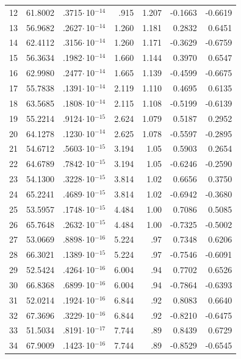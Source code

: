 \begin{longtable}{lrrrrrr}
12 & 61.8002 & .3715$\cdot$\,10$^{-14}$ & .915 & 1.207 & -0.1663 & -0.6619 \\
13 & 56.9682 & .2627$\cdot$\,10$^{-14}$ & 1.260 & 1.181 & 0.2832 & 0.6451 \\
14 & 62.4112 & .3156$\cdot$\,10$^{-14}$ & 1.260 & 1.171 & -0.3629 & -0.6759 \\
15 & 56.3634 & .1982$\cdot$\,10$^{-14}$ & 1.660 & 1.144 & 0.3970 &  0.6547 \\
16 & 62.9980 & .2477$\cdot$\,10$^{-14}$ & 1.665 & 1.139 & -0.4599 & -0.6675 \\
17 & 55.7838 & .1391$\cdot$\,10$^{-14}$ & 2.119 & 1.110 & 0.4695 & 0.6135 \\
18 & 63.5685 & .1808$\cdot$\,10$^{-14}$ & 2.115 & 1.108 & -0.5199 & -0.6139 \\
19 & 55.2214 & .9124$\cdot$\,10$^{-15}$ & 2.624 & 1.079 & 0.5187 & 0.2952 \\
20 & 64.1278 & .1230$\cdot$\,10$^{-14}$ & 2.625 & 1.078 & -0.5597 & -0.2895 \\
21 & 54.6712 & .5603$\cdot$\,10$^{-15}$ & 3.194 & 1.05 & 0.5903 & 0.2654 \\
22 & 64.6789 & .7842$\cdot$\,10$^{-15}$ & 3.194 & 1.05 & -0.6246 & -0.2590 \\
23 & 54.1300 & .3228$\cdot$\,10$^{-15}$ & 3.814 & 1.02 & 0.6656 & 0.3750 \\
24 & 65.2241 & .4689$\cdot$\,10$^{-15}$ & 3.814 & 1.02 & -0.6942 & -0.3680 \\
25 & 53.5957 & .1748$\cdot$\,10$^{-15}$ & 4.484 & 1.00 & 0.7086 & 0.5085 \\
26 & 65.7648 & .2632$\cdot$\,10$^{-15}$ & 4.484 & 1.00 & -0.7325 & -0.5002 \\
27 & 53.0669 & .8898$\cdot$\,10$^{-16}$ & 5.224 & .97 & 0.7348 & 0.6206 \\
28 & 66.3021 & .1389$\cdot$\,10$^{-15}$ & 5.224 & .97 & -0.7546 & -0.6091 \\
29 & 52.5424 & .4264$\cdot$\,10$^{-16}$ & 6.004 & .94 & 0.7702 & 0.6526 \\
30 & 66.8368 & .6899$\cdot$\,10$^{-16}$ & 6.004 & .94 & -0.7864 & -0.6393 \\
31 & 52.0214 & .1924$\cdot$\,10$^{-16}$ & 6.844 & .92 & 0.8083 & 0.6640 \\
32 & 67.3696 & .3229$\cdot$\,10$^{-16}$ & 6.844 & .92 & -0.8210 & -0.6475 \\
33 & 51.5034 & .8191$\cdot$\,10$^{-17}$ & 7.744 & .89 & 0.8439 & 0.6729 \\
34 & 67.9009 & .1423$\cdot$\,10$^{-16}$ & 7.744 & .89 & -0.8529 & -0.6545 \\

\end{longtable}

